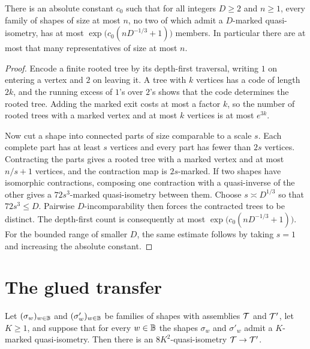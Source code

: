 \begin{lemma}
\label{thm:dilution}
\leanok
{}
There is an absolute constant $c_0$ such that for all integers $D\geq2$ and $n\geq1$, every
family of shapes of size at most $n$, no two of which admit a $D$-marked quasi-isometry, has
at most $\exp\bigl(c_0(nD^{-1/3}+1)\bigr)$ members. In particular there are at most that many
representatives of size at most $n$.
\end{lemma}

\begin{proof}
\leanok
Encode a finite rooted tree by its depth-first traversal, writing $1$ on entering a vertex and
$2$ on leaving it. A tree with $k$ vertices has a code of length $2k$, and the running excess
of $1$'s over $2$'s shows that the code determines the rooted tree. Adding the marked exit costs
at most a factor $k$, so the number of rooted trees with a marked vertex and at most $k$ vertices
is at most $e^{3k}$.

Now cut a shape into connected parts of size comparable to a scale $s$. Each complete part has
at least $s$ vertices and every part has fewer than $2s$ vertices. Contracting the parts gives a
rooted tree with a marked vertex and at most $n/s+1$ vertices, and the contraction map is
$2s$-marked. If two shapes have isomorphic contractions, composing one contraction with a
quasi-inverse of the other gives a $72s^3$-marked quasi-isometry between them. Choose
$s\asymp D^{1/3}$ so that $72s^3\leq D$. Pairwise $D$-incomparability then forces the contracted
trees to be distinct. The depth-first count is consequently at most
$\exp\bigl(c_0(nD^{-1/3}+1)\bigr)$. For the bounded range of smaller $D$, the same estimate
follows by taking $s=1$ and increasing the absolute constant.
\end{proof}

\section{The glued transfer}

\begin{lemma}
\label{thm:glued-transfer}
\leanok
{}
Let $(\sigma_w)_{w\in\mathbb{B}}$ and $(\sigma'_w)_{w\in\mathbb{B}}$ be families of shapes with assemblies
$\mathcal{T}$ and $\mathcal{T}'$, let $K\geq1$, and suppose that for every $w\in\mathbb{B}$ the shapes $\sigma_w$
and $\sigma'_w$ admit a $K$-marked quasi-isometry. Then there is an $8K^2$-quasi-isometry
$\mathcal{T}\to\mathcal{T}'$.
\end{lemma}

